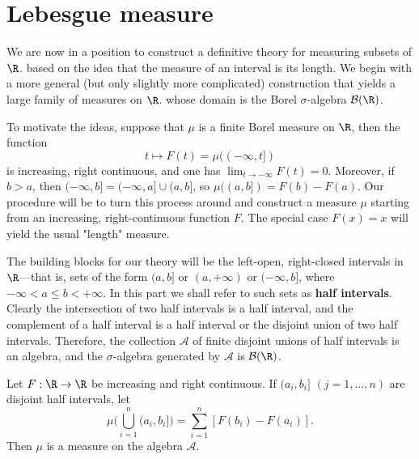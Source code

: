 \section{Lebesgue measure}
We are now in a position to construct a definitive theory for measuring subsets of $\R$. based on the idea that the measure of an interval is its length. We begin with a more general (but only slightly more complicated) construction that yields a large family of measures on $\R$. whose domain is the Borel $\sigma$-algebra $\mathcal{B}(\R)$.\par
To motivate the ideas, suppose that $\mu$ is a finite Borel measure on $\R$, then the function
\[t\mapsto F(t)=\mu((-\infty,t])\]
is increasing, right continuous, and one has $\lim_{t\to-\infty}F(t)=0$. Moreover, if $b>a$, then $(-\infty,b]=(-\infty,a]\cup(a,b]$, so $\mu((a,b])=F(b)-F(a)$. Our procedure will be to turn this process around and construct a measure $\mu$ starting from an increasing, right-continuous function $F$. The special case $F(x)=x$ will yield the usual "length" measure.\par
The building blocks for our theory will be the left-open, right-closed intervals in $\R$---that is, sets of the form $(a,b]$ or $(a,+\infty)$ or $(-\infty,b]$, where $-\infty<a\leq b<+\infty$. In this part we shall refer to such sets as \textbf{half intervals}. Clearly the intersection of two half intervals is a half interval, and the complement of a half interval is a half interval or the disjoint union of two half intervals. Therefore, the collection $\mathcal{A}$ of finite disjoint unions of half intervals is an algebra, and the $\sigma$-algebra generated by $\mathcal{A}$ is $\mathcal{B}(\R)$.
\begin{lemma}\label{measure Borel lem}
Let $F:\R\to\R$ be increasing and right continuous. If $(a_i,b_i]$ $(j=1,\dots,n)$ are disjoint half intervals, let
\[\mu\Big(\bigcup_{i=1}^{n}(a_i,b_i]\Big)=\sum_{i=1}^{n}[F(b_i)-F(a_i)].\]
Then $\mu$ is a measure on the algebra $\mathcal{A}$.
\end{lemma}
